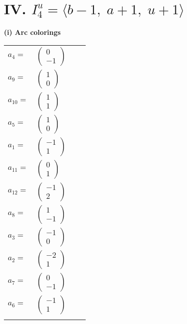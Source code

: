 \documentclass[1p]{elsarticle_modified}
\theoremstyle{definition}
\begin{document}
\centering \section*{IV. $I^u_{4}= \langle b-1,\;a+1,\;u+1 \rangle$}
\flushleft \textbf{(i) Arc colorings}\\
\begin{tabular}{m{7pt} m{180pt} m{7pt} m{180pt} }
\flushright $a_{4}=$&$\begin{pmatrix}0\\-1\end{pmatrix}$ \\
\flushright $a_{9}=$&$\begin{pmatrix}1\\0\end{pmatrix}$ \\
\flushright $a_{10}=$&$\begin{pmatrix}1\\1\end{pmatrix}$ \\
\flushright $a_{5}=$&$\begin{pmatrix}1\\0\end{pmatrix}$ \\
\flushright $a_{1}=$&$\begin{pmatrix}-1\\1\end{pmatrix}$ \\
\flushright $a_{11}=$&$\begin{pmatrix}0\\1\end{pmatrix}$ \\
\flushright $a_{12}=$&$\begin{pmatrix}-1\\2\end{pmatrix}$ \\
\flushright $a_{8}=$&$\begin{pmatrix}1\\-1\end{pmatrix}$ \\
\flushright $a_{3}=$&$\begin{pmatrix}-1\\0\end{pmatrix}$ \\
\flushright $a_{2}=$&$\begin{pmatrix}-2\\1\end{pmatrix}$ \\
\flushright $a_{7}=$&$\begin{pmatrix}0\\-1\end{pmatrix}$ \\
\flushright $a_{6}=$&$\begin{pmatrix}-1\\1\end{pmatrix}$\\&\end{tabular}
\end{document}
